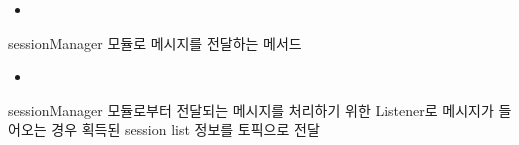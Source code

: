 \documentclass[a4paper,10pt,english]{sphinxmanual}
\begin{document}
\begin{fulllineitems}
\begin{fulllineitems}
\nopagebreak

\begin{itemize}
\item {} 
\sphinxAtStartPar
{\hyperref[\detokenize{_RMSync:RMSync._dmUpdateReferenceModel}]{}}

\end{itemize}



\end{fulllineitems}


\begin{fulllineitems}
\label{\detokenize{_DHDaemon:DHDaemon._smInit}}
\pysigstartsignatures
{}
\pysigstopsignatures
\sphinxAtStartPar
sessionManager 모듈로  메시지를 전달하는 메서드


\nopagebreak

\begin{itemize}
\item {} 
\sphinxAtStartPar
{\hyperref[\detokenize{_SessionManager:SessionManager._dhDaemonListener}]{}}

\end{itemize}



\end{fulllineitems}


\begin{fulllineitems}
\label{\detokenize{_DHDaemon:DHDaemon._smListener}}
\pysigstartsignatures
{}
\pysigstopsignatures
\sphinxAtStartPar
sessionManager 모듈로부터 전달되는 메시지를 처리하기 위한 Listener로  메시지가 들어오는 경우
획득된 session list 정보를  토픽으로 전달



\end{fulllineitems}
\end{fulllineitems}
\end{document}
